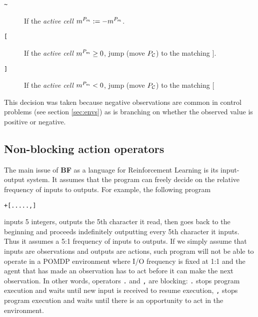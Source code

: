 \begin{description}
\item[ \texttt{\~} ] If the \textit{active cell} $m^{P_m} := - m^{P_m}$.
\item[ \texttt{[} ] If the \textit{active cell} $m^{P_m} \geq 0$, jump (move $P_{\mathcal{C}}$) to the matching $]$.
\item[ \texttt{]} ] If the \textit{active cell} $m^{P_m} < 0$, jump (move $P_{\mathcal{C}}$) to the matching $[$
\end{description}

This decision was taken because negative observations are common in control problems (see section \ref{sec:envs}) as is branching on whether the observed value is positive or negative. 

\subsection{Non-blocking action operators}
\label{sec:queue}


The main issue of \textbf{BF} as a language for Reinforcement Learning is its input-output system.
It assumes that the program can freely decide on the relative frequency of inputs to outputs.
For example, the following program

\begin{center}
\begin{lstlisting}
+[.....,]
\end{lstlisting}
\end{center}

inputs 5 integers, outputs the 5th character it read, then goes back to the beginning and proceeds indefinitely outputting every 5th character it inputs.
Thus it assumes a 5:1 frequency of inputs to outputs.
If we simply assume that inputs are observations and outputs are actions, such program will not be able to operate in a POMDP environment where I/O frequency is fixed at 1:1 and the agent that has made an observation has to act before it can make the next observation.
In other words, operators \texttt{.} and \texttt{,} are blocking: \texttt{.} stops program execution and waits until new input is received to resume execution, \texttt{,} stops program execution and waits until there is an opportunity to act in the environment.

